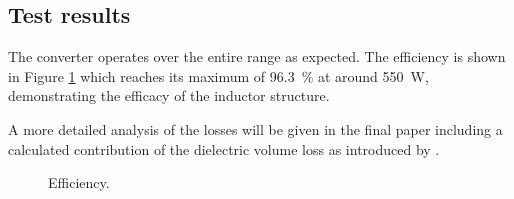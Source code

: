 \documentclass{IPEC2026}
\begin{document}
\subsection{Test results}
The converter operates over the entire range as expected. The efficiency is shown in Figure \ref{fig:Efficiency} which reaches its maximum of \qty{96.3}{\percent} at around \qty{550}{\W}, demonstrating the efficacy of the inductor structure.

A more detailed analysis of the losses will be given in the final paper including a calculated contribution of the dielectric volume loss as introduced by \cite{baumannInvestigationCorelossMechanisms2022}. 

\begin{figure}
  \centering
  
  \caption{Efficiency.}
  \label{fig:Efficiency}
\end{figure}



\end{document}
